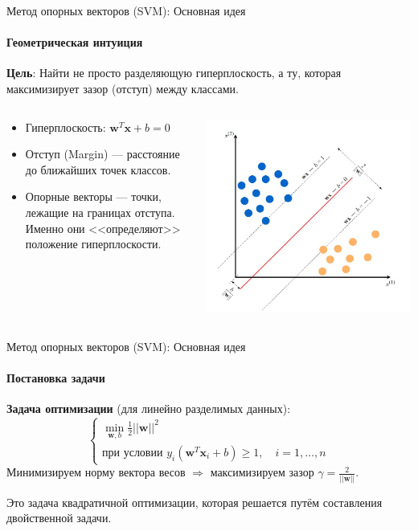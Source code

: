 \documentclass[notheorems, handout]{beamer}
\begin{document}
\begin{frame}{Метод опорных векторов (SVM): Основная идея}
	\framesubtitle{Геометрическая интуиция}

	\textbf{Цель}: Найти не просто разделяющую гиперплоскость, а ту, которая \alert{максимизирует зазор (отступ)} между классами.

	\begin{columns}
		\begin{column}{0.5\textwidth}
			\begin{itemize}
				\item Гиперплоскость: $\mathbf{w}^T \mathbf{x} + b = 0$
				\item \alert{Отступ (Margin)} — расстояние до ближайших точек классов.
				\item \alert{Опорные векторы} — точки, лежащие на границах отступа. Именно они <<определяют>> положение гиперплоскости.
			\end{itemize}
		\end{column}
		\begin{column}{0.5\textwidth}
			\includegraphics[width=\textwidth]{img/svm_margin.jpg}
		\end{column}
	\end{columns}
\end{frame}

\begin{frame}{Метод опорных векторов (SVM): Основная идея}
	\framesubtitle{Постановка задачи}

	\textbf{Задача оптимизации} (для линейно разделимых данных):
	\[
	\begin{cases}
		\min_{\mathbf{w}, b} \frac{1}{2} ||\mathbf{w}||^2 \\
		\text{при условии } y_i (\mathbf{w}^T \mathbf{x}_i + b) \geq 1, \quad i = 1, \dots, n
	\end{cases}
	\]
	Минимизируем норму вектора весов $\Rightarrow$ \alert{максимизируем зазор} $\gamma = \frac{2}{||\mathbf{w}||}$.

	Это задача квадратичной оптимизации, которая решается путём составления двойственной задачи.
\end{frame}
\end{document}
